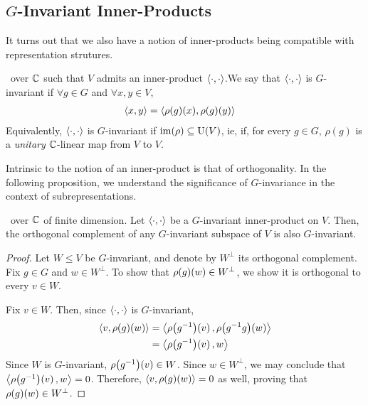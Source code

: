 \subsection{$G$-Invariant Inner-Products}

It turns out that we also have a notion of inner-products being compatible with representation strutures.

\begin{boxdefinition}
    \ over $\mathbb{C}$ such that $V$ admits an inner-product $\left\langle \cdot, \cdot \right\rangle$.We say that $\left\langle \cdot, \cdot \right\rangle$ is $G$-invariant if $\forall g \in G$ and $\forall x, y \in V$,
    \begin{align*}
        \left\langle x,y \right\rangle &= \left\langle \rho(g)(x), \rho(g)(y) \right\rangle
    \end{align*}
    Equivalently, $\left\langle \cdot, \cdot \right\rangle$ is $G$-invariant if $\operatorname{im}\!\left( \rho \right) \subseteq \operatorname{U}\!\left( V \right)$, ie, if, for every $g \in G$, $\rho(g)$ is a \textit{unitary} $\mathbb{C}$-linear map from $V$ to $V$.
\end{boxdefinition}

Intrinsic to the notion of an inner-product is that of orthogonality. In the following proposition, we understand the significance of $G$-invariance in the context of subrepresentations.

\begin{proposition} \label{Ch1:Prop:Orth_Compl_of_Inv_Inv}
    \ over $\mathbb{C}$ of finite dimension. Let $\left\langle \cdot, \cdot \right\rangle$ be a $G$-invariant inner-product on $V$. Then, the orthogonal complement of any $G$-invariant subspace of $V$ is also $G$-invariant.
\end{proposition}
\begin{proof}
    Let $W \leq V$ be $G$-invariant, and denote by $W^\perp$ its orthogonal complement. Fix $g \in G$ and $w \in W^\perp$. To show that $\rho\!\left( g \right)\!\left( w \right) \in W^\perp$, we show it is orthogonal to every $v \in W$.

    Fix $v \in W$. Then, since $\left\langle \cdot, \cdot \right\rangle$ is $G$-invariant,
    \begin{align*}
        \cycl{v, \rhoff{g}{w}} &= \cycl{\rhoff{g\inv}{v}, \rhoff{g\inv g}{w}} \\
        &= \cycl{\rhoff{g\inv}{v}, w}
    \end{align*}
    Since $W$ is $G$-invariant, $\rho\!\left( g^{-1} \right)\!\left( v \right) \in W$. Since $w \in W^\perp$, we may conclude that $\left\langle \rho\!\left( g^{-1} \right)\!\left( v \right), w \right\rangle = 0$. Therefore, $\left\langle v, \rho\!\left( g \right)\!\left( w \right) \right\rangle = 0$ as well, proving that $\rho\!\left( g \right)\!\left( w \right) \in W^\perp$.
\end{proof}

